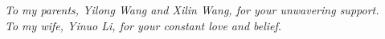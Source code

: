 \chapter*{~}


\begin{center}                  %
\vspace*{3in}                   %
    \begin{onehalfspacing}      %
    \textit{
      To my parents, Yilong Wang and Xilin Wang, for your unwavering support. \\To my wife, Yinuo Li, for your constant love and belief.
    }
\end{onehalfspacing}
\end{center}

